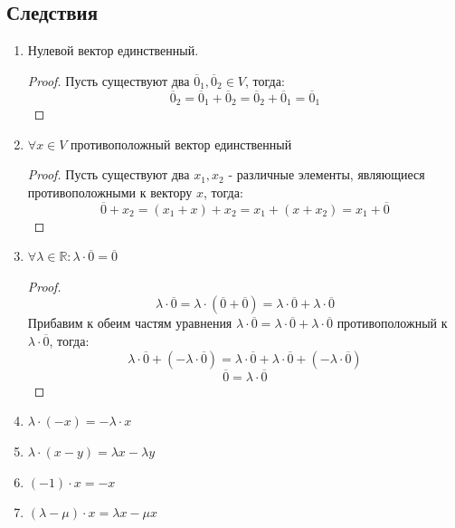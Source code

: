 \documentclass[a4paper, 12pt]{article}
\newcommand{\R}{\mathbb R}
\theoremstyle{definition}
\begin{document}
  \subsection{Следствия}
  \begin{enumerate}
    \item Нулевой вектор единственный.
    \begin{proof}
      Пусть существуют два $\overline{0}_1,\overline{0}_2 \in V$, тогда: $$\overline{0}_2 = \overline{0}_1 + \overline{0}_2 = \overline{0}_2 + \overline{0}_1 = \overline{0}_1$$   
    \end{proof} 
    \item $\forall x \in V$ противоположный вектор единственный
    \begin{proof}
      Пусть существуют два $x_1,x_2$ - различные элементы,  являющиеся противоположными к вектору $x$, тогда:
      $$\overline{0} + x_2 = (x_1 + x) + x_2 = x_1 + (x + x_2) = x_1 + \overline{0}$$    
    \end{proof} 
    \item $\forall \lambda \in \R: \lambda \cdot \overline{0} = \overline{0}$ 
      \begin{proof}
      $$\lambda \cdot \overline{0} = \lambda \cdot (\overline{0}+\overline{0}) = \lambda \cdot \overline{0} + \lambda \cdot \overline{0}$$ Прибавим к обеим частям уравнения $\lambda \cdot \overline{0} = \lambda \cdot \overline{0} + \lambda \cdot \overline{0}$  противоположный к $\lambda \cdot \overline{0}$, тогда: $$\lambda \cdot \overline{0} + (-\lambda \cdot \overline{0})= \lambda \cdot \overline{0} + \lambda \cdot \overline{0} + (-\lambda \cdot \overline{0})$$ $$\overline{0} = \lambda \cdot \overline{0}$$ 
      \end{proof} 
    \item $\lambda \cdot (-x) = -\lambda \cdot x$
    \item $\lambda \cdot (x-y) = \lambda x - \lambda y$ 
    \item $(-1) \cdot x = -x$
    \item $(\lambda - \mu)\cdot x = \lambda x - \mu x$  
  \end{enumerate}
\end{document}

